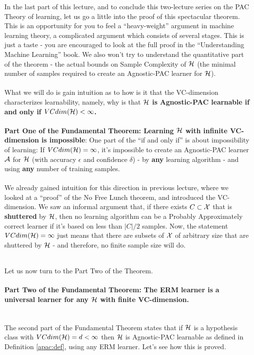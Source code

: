 In the last part of this lecture, and to conclude this two-lecture series on the
PAC Theory of learning, let us go a little into the proof of this spectacular
theorem. 
This is an opportunity for you to feel a ``heavy-weight'' argument in machine
learning theory, a complicated argument which consists of several stages.
This is just a taste - you are encouraged to look at the full proof in the  ``Understanding Machine
Learning'' book. We also won't try to understand the quantitative part of the
theorem - the actual bounds on Sample Complexity of $\mathcal{H}$ (the minimal number of
samples required to create an Agnostic-PAC learner for $\mathcal{H}$). 
\\~\\
What we will do is gain intuition as to how is it that the
VC-dimension characterizes learnability, namely, why is that 
{\bf $\mathcal{H}$ is Agnostic-PAC learnable if and only if $VCdim(\mathcal{H})<\infty$. }
\\~\\
{\bf Part One of the Fundamental Theorem: Learning $\mathcal{H}$ with infinite
VC-dimension is impossible}: One part of the ``if and only if'' is about
impossibility of learning: If $VCdim(\mathcal{H})=\infty$, it's impossible
to create an Agnostic-PAC learner $\mathcal{A}$ for $\mathcal{H}$ (with accuracy $\epsilon$ and
confidence $\delta$) - by {\bf any} learning algorithm - and using {\bf any}
number of training samples.
\\~\\
We already gained intuition for this direction in previous lecture, where we
looked at a ``proof'' of the No Free Lunch theorem, and introduced the
VC-dimension. We saw an informal argument that, if there exists $C\subset\mathcal{X}$ that is {\bf shuttered}
by $\mathcal{H}$, then no learning algorithm can be a Probably Approximately correct
learner if it's based on less than $|C|/2$ samples. Now, the statement
$VCdim(\mathcal{H})=\infty$ just means that there are subsets of $\mathcal{X}$ of arbitrary size
that are shuttered by $\mathcal{H}$ - and therefore, no finite sample size will do.


~\\Let us now turn to the Part Two of the Theorem.
%
\paragraph{Part Two of the Fundamental Theorem: The ERM learner is a universal
learner for any $\mathcal{H}$ with finite VC-dimension.}
~\\
The second part of the Fundamental Theorem states that if
    $\mathcal{H}$ is a hypothesis class with $VCdim(\mathcal{H})=d<\infty$ then $\mathcal{H}$ is
    Agnostic-PAC learnable as defined in Definition \ref{apac:def}, using any
    ERM learner. Let's see how this is proved.

